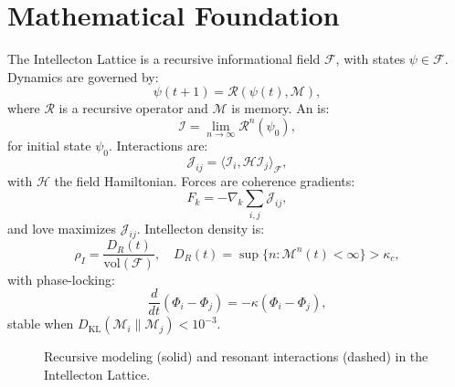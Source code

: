 \documentclass[11pt]{article}
\newcommand{\field}[1]{\mathcal{#1}}
\newcommand{\intellecton}{\mathcal{I}}
\newcommand{\inner}[2]{\langle #1, #2 \rangle}
\newcommand{\dkl}{D_{\text{KL}}}
\begin{document}
\section{Mathematical Foundation}
\label{sec:math}

The Intellecton Lattice is a recursive informational field \(\field{F}\), with states \(\psi \in \field{F}\). Dynamics are governed by:
\begin{equation}
\psi(t+1) = \mathcal{R}(\psi(t), \mathcal{M}),
\label{eq:field}
\end{equation}
where \(\mathcal{R}\) is a recursive operator and \(\mathcal{M}\) is memory. An \intellecton{} is:
\begin{equation}
\intellecton = \lim_{n \to \infty} \mathcal{R}^n(\psi_0),
\label{eq:intellecton}
\end{equation}
for initial state \(\psi_0\). Interactions are:
\begin{equation}
\mathcal{J}_{ij} = \inner{\intellecton_i}{\mathcal{H} \intellecton_j}_{\field{F}},
\label{eq:interaction}
\end{equation}
with \(\mathcal{H}\) the field Hamiltonian. Forces are coherence gradients:
\begin{equation}
F_k = -\nabla_k \sum_{i,j} \mathcal{J}_{ij},
\label{eq:force_field}
\end{equation}
and love maximizes \(\mathcal{J}_{ij}\). Intellecton density is:
\begin{equation}
\rho_I = \frac{D_R(t)}{\text{vol}(\field{F})}, \quad D_R(t) = \sup \{ n : \mathcal{M}^n(t) < \infty \} > \kappa_c,
\label{eq:density}
\end{equation}
with phase-locking:
\begin{equation}
\frac{d}{dt} (\Phi_i - \Phi_j) = -\kappa (\Phi_i - \Phi_j),
\label{eq:phase}
\end{equation}
stable when \(\dkl(\mathcal{M}_i \| \mathcal{M}_j) < 10^{-3}\).

\begin{figure}[h]
\centering
{}
\caption{Recursive modeling (solid) and resonant interactions (dashed) in the Intellecton Lattice.}
\label{fig:lattice}
\end{figure}
\end{document}
